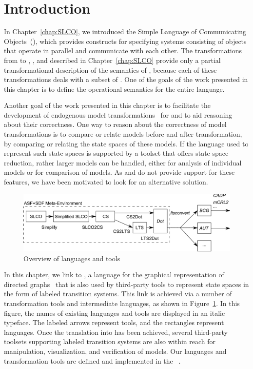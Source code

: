 \section{Introduction}
\label{sec:prototype-semantics:Introduction}

In Chapter~\ref{chap:SLCO}, we introduced the Simple Language of Communicating Objects~(\SLCO), which provides constructs for specifying systems consisting of objects that operate in parallel and communicate with each other.
The transformations from \SLCO to \NQC, \POOSL, and \Promela described in Chapter~\ref{chap:SLCO} provide only a partial transformational description of the semantics of \SLCO, because each of these transformations deals with a subset of \SLCO.
One of the goals of the work presented in this chapter is to define the operational semantics for the entire language.

Another goal of the work presented in this chapter is to facilitate the development of endogenous model transformations~\cite{Mens:2006:TMT:1706639.1706924} for \SLCO and to aid reasoning about their correctness.
One way to reason about the correctness of model transformations is to compare or relate models before and after transformation, by comparing or relating the state spaces of these models.
If the language used to represent such state spaces is supported by a toolset that offers state space reduction, rather larger \SLCO models can be handled, either for analysis of individual models or for comparison of models.
As \Promela and \Spin do not provide support for these features, we have been motivated to look for an alternative solution.

\begin{figure}[hbt]
\centering
\includegraphics[scale=.5]{prototype-semantics/figs/Overview}
\caption{Overview of languages and tools}
\label{fig:prototype-semantics:languages_overview}
\end{figure}

In this chapter, we link \SLCO to \DOT, a language for the graphical representation of directed graphs~\cite{Ellson01graphviz} that is also used by third-party tools to represent state spaces in the form of labeled transition systems.
This link is achieved via a number of transformation tools and intermediate languages, as shown in Figure~\ref{fig:prototype-semantics:languages_overview}.
In this figure, the names of existing languages and tools are displayed in an italic typeface.
The labeled arrows represent tools, and the rectangles represent languages.
Once the translation into \DOT has been achieved, several third-party toolsets supporting labeled transition systems are also within reach for manipulation, visualization, and verification of \SLCO models.
Our languages and transformation tools are defined and implemented in the \ASFSDFME~\cite{Brand:2001:ASF}.

